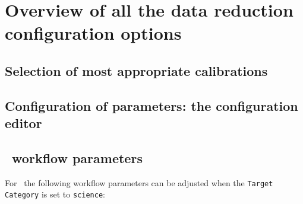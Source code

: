 \section{Overview of all the data reduction configuration options}
\label{sec:configuretion_overview}

\subsection{Selection of most appropriate calibrations}



\subsection{Configuration of parameters: the configuration editor}
\label{sec:configuration_editor}




\subsection{\instname\ workflow parameters}
For \instname\, the following workflow parameters can be adjusted when
the {\tt Target Category} is set to {\tt science}:

